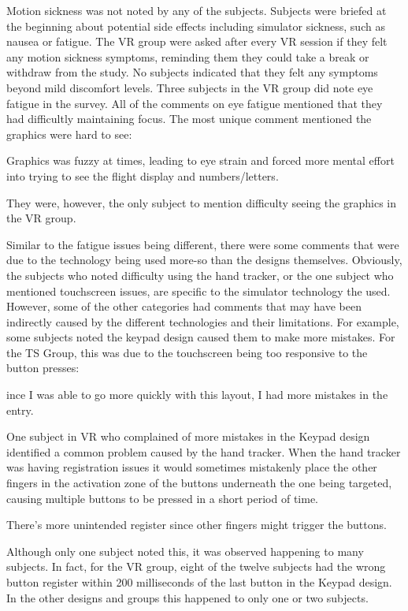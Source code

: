 Motion sickness was not noted by any of the subjects.
Subjects were briefed at the beginning about potential side effects including simulator sickness, such as nausea or fatigue.
The VR group were asked after every VR session if they felt any motion sickness symptoms, reminding them they could take a break or withdraw from the study.
No subjects indicated that they felt any symptoms beyond mild discomfort levels.
Three subjects in the VR group did note eye fatigue in the survey.
All of the comments on eye fatigue mentioned that they had difficultly maintaining focus.
The most unique comment mentioned the graphics were hard to see:
\begin{displayquote}[VR Subject]
    Graphics was fuzzy at times, leading to eye strain and forced more mental effort into trying to see the flight display and numbers/letters.
\end{displayquote}
They were, however, the only subject to mention difficulty seeing the graphics in the VR group.

Similar to the fatigue issues being different, there were some comments that were due to the technology being used more-so than the designs themselves.
Obviously, the subjects who noted difficulty using the hand tracker, or the one subject who mentioned touchscreen issues, are specific to the simulator technology the used.
However, some of the other categories had comments that may have been indirectly caused by the different technologies and their limitations.
For example, some subjects noted the keypad design caused them to make more mistakes.
For the TS Group, this was due to the touchscreen being too responsive to the button presses:
\begin{displayquote}[TS Subject]
    ince I was able to go more quickly with this layout, I had more mistakes in the entry.
\end{displayquote}
One subject in VR who complained of more mistakes in the Keypad design identified a common problem caused by the hand tracker.
When the hand tracker was having registration issues it would sometimes mistakenly place the other fingers in the activation zone of the buttons underneath the one being targeted, causing multiple buttons to be pressed in a short period of time.
\begin{displayquote}[VR Subject]
    There's more unintended register since other fingers might trigger the buttons.
\end{displayquote}
Although only one subject noted this, it was observed happening to many subjects.
In fact, for the VR group, eight of the twelve subjects had the wrong button register within 200 milliseconds of the last button in the Keypad design.
In the other designs and groups this happened to only one or two subjects.


